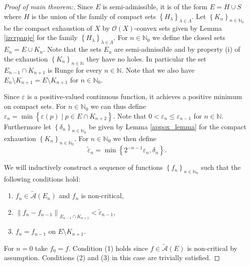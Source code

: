 \documentclass[a4paper,11pt]{amsart}
\newcommand{\N}{\mathbb N}
\newcommand{\set}[1]{\left\{#1\right\}}
\newcommand{\norm}[1]{\left\lVert#1\right\rVert}
\begin{document}
\begin{proof}[Proof of main theorem:]
    Since $E$ is semi-admissible, it is of the form $E = H \cup S$ where $H$ is the union of the family of compact sets $\set{H_\lambda}_{\lambda \in \Lambda}$. 
    Let $\set{K_n}_{n \in \N_0}$ be the compact exhaustion of $X$ by $\mathcal{O}(X)$-convex sets given by Lemma \ref{izcrpanje} for the family $\set{H_\lambda}_{\lambda \in \Lambda}$.
    For $n \in \N_0$ we define the closed sets $E_n = E \cup K_n$. 
    Note that the sets $E_n$ are semi-admissible and by property (i) of the exhaustion $\set{K_n}_{n \in \N}$ they have no holes.
    In particular the set $E_{n-1} \cap K_{n+1}$ is Runge for every $n \in \N$.
    Note that we also have $E_n \setminus K_{n+1} = E \setminus K_{n+1}$ for $n \in \N_0$.

    Since $\varepsilon$ is a positive-valued continuous function, it achieves a positive minimum on compact sets. 
    For $n \in \N_0$ we can thus define $\varepsilon_n = \min \set{\varepsilon(p) \mid p \in E \cap K_{n+2}}$. 
    Note that $0 < \varepsilon_n \le \varepsilon_{n-1}$ for $n \in \N$.
    Furthermore let $\set{\delta_n}_{n \in \N_0}$ be given by Lemma \ref{appox_lemma} for the compact exhaustion $\set{K_n}_{n \in \N_0}$.
    For $n \in \N_0$ we then define 
    \[\tilde{\varepsilon}_n = \min\set{2^{-n-1}\varepsilon_n, \delta_n}.\]

    We will inductively construct a sequence of functions $\set{f_n}_{n \in \N_0}$ such that the following conditions hold:
    \begin{samepage}
        \begin{enumerate}[(1)]
            \item $f_n \in \widetilde{\mathcal{A}}(E_n)$ and $f_n$ is non-critical,
            \item $\norm{f_n - f_{n-1}}_{E_{n-1} \cap K_{n+1}} < \tilde{\varepsilon}_{n-1}$,
            \item $f_n = f_{n-1}$ on $E \setminus K_{n+1}$.
        \end{enumerate}
    \end{samepage}

    For $n=0$ take $f_0 = f$. 
    Condition (1) holds since $f \in \widetilde{\mathcal{A}}(E)$ is non-critical by assumption.
    Conditions (2) and (3) in this case are trivially satisfied.
    

\end{proof}
\end{document}
